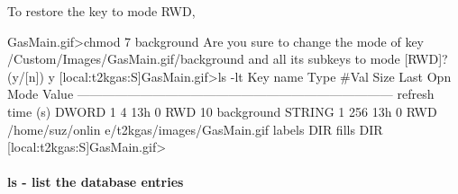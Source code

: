 To restore the key to mode RWD, 
\begin{DoxyCode}
GasMain.gif>chmod 7 background
Are you sure to change the mode of key
  /Custom/Images/GasMain.gif/background
and all its subkeys
to mode [RWD]? (y/[n]) y
[local:t2kgas:S]GasMain.gif>ls -lt
Key name                        Type    #Val  Size  Last Opn Mode Value
---------------------------------------------------------------------------
refresh time (s)                DWORD   1     4     13h  0   RWD  10
background                      STRING  1     256   13h  0   RWD  /home/suz/onlin
      e/t2kgas/images/GasMain.gif
labels                          DIR
fills                           DIR
[local:t2kgas:S]GasMain.gif>
\end{DoxyCode}




\hypertarget{RC_odbedit_examples_RC_odbedit_ls}{}\paragraph{ls -\/ list the database entries}\label{RC_odbedit_examples_RC_odbedit_ls}


